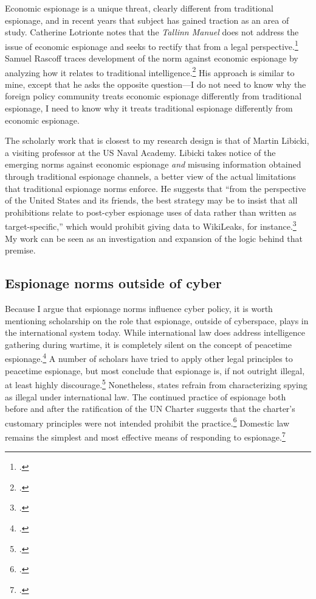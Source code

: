 \documentclass{memoir}
\begin{document}
\begin{refsegment}
Economic espionage is a unique threat, clearly different from traditional espionage, and in recent years that subject has gained traction as an area of study. Catherine Lotrionte notes that the \emph{Tallinn Manuel} does not address the issue of economic espionage and seeks to rectify that from a legal perspective.\footcite{lotrionte_countering_2015} Samuel Rascoff traces development of the norm against economic espionage by analyzing how it relates to traditional intelligence.\footcite{rascoff_norm_2016} His approach is similar to mine, except that he asks the opposite question---I do not need to know why the foreign policy community treats economic espionage differently from traditional espionage, I need to know why it treats traditional espionage differently from economic espionage.

The scholarly work that is closest to my research design is that of Martin Libicki, a visiting professor at the US Naval Academy. Libicki takes notice of the emerging norms against economic espionage \emph{and} misusing information obtained through traditional espionage channels, a better view of the actual limitations that traditional espionage norms enforce. He suggests that ``from the perspective of the United States and its friends, the best strategy may be to insist that all prohibitions relate to post-cyber espionage uses of data rather than written as target-specific,'' which would prohibit giving data to WikiLeaks, for instance.\footcite[p.~11]{libicki_coming_2017} My work can be seen as an investigation and expansion of the logic behind that premise.


\subsection{Espionage norms outside of cyber}
Because I argue that espionage norms influence cyber policy, it is worth mentioning scholarship on the role that espionage, outside of cyberspace, plays in the international system today. While international law does address intelligence gathering during wartime, it is completely silent on the concept of peacetime espionage.\footcite{radsan_unresolved_2007} A number of scholars have tried to apply other legal principles to peacetime espionage, but most conclude that espionage is, if not outright illegal, at least highly discourage.\footcite[p.~656]{beim_enforcing_2018} Nonetheless, states refrain from characterizing spying as illegal under international law. The continued practice of espionage both before and after the ratification of the UN Charter suggests that the charter's customary principles were not intended prohibit the practice.\footcite[p.~305]{deeks_international_2015} Domestic law remains the simplest and most effective means of responding to espionage.\footcite[p.~657]{beim_enforcing_2018}


\end{refsegment}
\end{document}
